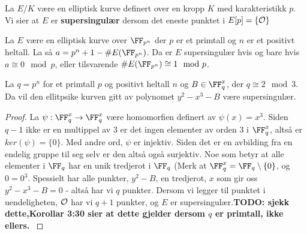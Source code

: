 
\begin{definisjon}
La $E/K$ være en elliptisk kurve definert over en kropp $K$ med karakteristikk $p$. Vi sier at $E$ er \textbf{supersingulær} dersom det eneste punktet i $E[p] = \{\mathcal{O} \}$
\end{definisjon}

\begin{proposisjon}
La $E$ være en elliptisk kurve over $\FF_{p^n}$ der $p$ er et primtall og $n$ er et positivt heltall. La så $a = p^n + 1 - \# E(\FF_{p^n})$. Da er $E$ supersingulær hvis og bare hvis $a \cong 0 \mod{p}$, eller tilsvarende $\#E(\FF_{p^n}) \cong 1 \mod{p}$.
\end{proposisjon}

\begin{proposisjon}
La $q = p^n$ for et primtall $p$ og positivt heltall $n$ og $B \in \FF_q^x$, der $q \cong 2 \mod{3}$. Da vil den ellitpsike kurven gitt av polynomet $y^2 - x^3 - B$ være supersingulær.

\begin{proof}
La $\psi:  \FF_q^x \rightarrow  \FF_q^x$ være homomorfien definert av $\psi(x) = x^3$. Siden $q-1$ ikke er en multippel av $3$ er det ingen elementer av orden $3$ i $ \FF_q^x$, altså er $ker(\psi) = \{0\}$. Med andre ord, $\psi$ er injektiv. Siden det er en avbilding fra en endelig gruppe til seg selv er den altså også surjektiv. Noe som betyr at alle elementer i $\FF_q$ har en unik tredjerot i $\FF_q$ (Merk at $\FF_q^x = \FF_q \setminus \{0\}$, og $0 = 0^3$. Spessielt har alle punkter, $y^2 - B$, en tredjerot, $x$ som gir oss $y^2 - x^3 - B = 0$ - altså har vi $q$ punkter. Dersom vi legger til punktet i uendeligheten, $\mathcal{O}$ har vi $q+1$ punkter, og $E$ er supersingulær.\textbf{TODO: sjekk dette,Korollar 3:30 sier at dette gjelder dersom $q$ er primtall, ikke ellers.}
\cite[4.3.1]{washington}
\end{proof}
\end{proposisjon}